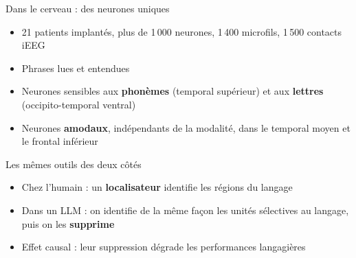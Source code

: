 \begin{frame}{Dans le cerveau : des neurones uniques}
\begin{itemize}
    \item 21 patients implantés, plus de 1\,000 neurones, 1\,400 microfils, 1\,500 contacts iEEG
    \item Phrases lues et entendues
    \item Neurones sensibles aux \textbf{phonèmes} (temporal supérieur) et aux \textbf{lettres} (occipito-temporal ventral)
    \item Neurones \textbf{amodaux}, indépendants de la modalité, dans le temporal moyen et le frontal inférieur
\end{itemize}
\end{frame}

\begin{frame}{Les mêmes outils des deux côtés}
\begin{itemize}
    \item Chez l'humain : un \textbf{localisateur} identifie les régions du langage
    \item Dans un LLM : on identifie de la même façon les unités sélectives au langage, puis on les \textbf{supprime}
    \item Effet causal : leur suppression dégrade les performances langagières
\end{itemize}
\end{frame}
